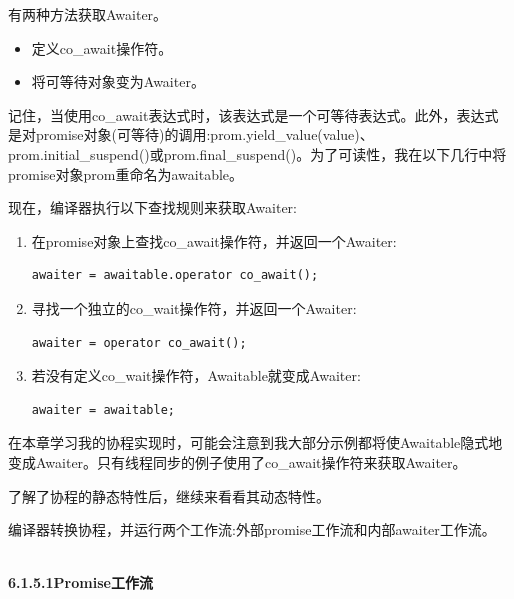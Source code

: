 有两种方法获取Awaiter。

\begin{itemize}
\item 
定义co\_await操作符。

\item 
将可等待对象变为Awaiter。
\end{itemize}

记住，当使用co\_await表达式时，该表达式是一个可等待表达式。此外，表达式是对promise对象(可等待)的调用:prom.yield\_value(value)、prom.initial\_suspend()或prom.final\_suspend()。为了可读性，我在以下几行中将promise对象prom重命名为awaitable。

现在，编译器执行以下查找规则来获取Awaiter:

\begin{enumerate}
\item 
在promise对象上查找co\_await操作符，并返回一个Awaiter:
\begin{lstlisting}[style=styleCXX]
awaiter = awaitable.operator co_await();
\end{lstlisting}

\item 
寻找一个独立的co\_wait操作符，并返回一个Awaiter:
\begin{lstlisting}[style=styleCXX]
awaiter = operator co_await();
\end{lstlisting}

\item 
若没有定义co\_wait操作符，Awaitable就变成Awaiter:
\begin{lstlisting}[style=styleCXX]
awaiter = awaitable;
\end{lstlisting}
\end{enumerate}

\begin{tcolorbox}[breakable,enhanced jigsaw,colback=blue!5!white,colframe=blue!75!black,title={awaiter = awaitable}]
在本章学习我的协程实现时，可能会注意到我大部分示例都将使Awaitable隐式地变成Awaiter。只有线程同步的例子使用了co\_await操作符来获取Awaiter。
\end{tcolorbox}

了解了协程的静态特性后，继续来看看其动态特性。


编译器转换协程，并运行两个工作流:外部promise工作流和内部awaiter工作流。

\hspace*{\fill} \\ %
\noindent
\textbf{6.1.5.1\hspace{0.2cm}Promise工作流}


